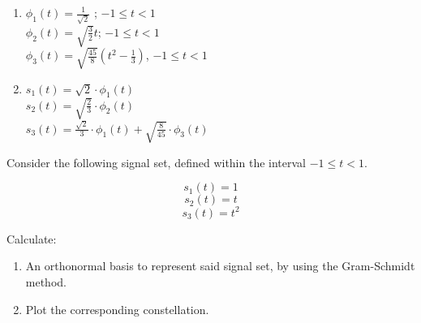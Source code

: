 \documentclass[es,boletin]{uah}
\begin{document}
{
\begin{enumerate}
	\item $\phi_1(t) = \frac{1}{\sqrt{2}}$ ; $-1 \leq t < 1$\\
	 $\phi_2(t) = \sqrt{\frac{3}{2}}t$; $-1 \leq t < 1$\\
	 $\phi_3(t) = \sqrt{\frac{45}{8}}\left ( t^2 - \frac{1}{3}\right )$, $-1 \leq t < 1$
	\item $s_1(t) = \sqrt{2}\cdot \phi_1(t)$\\
		 $s_2(t)=\sqrt{\frac{2}{3}} \cdot \phi_2(t)$\\
		  $s_3(t) = \frac{\sqrt{2}}{3}\cdot \phi_1(t) + \sqrt{\frac{8}{45}} \cdot \phi_3(t)$
\end{enumerate}
}
{

	Consider the following signal set, defined within the interval $-1 \leq t < 1$.

	\begin{displaymath}
		s_1 (t)=1 
	\end{displaymath}
	\begin{displaymath}
		s_2(t) = t
	\end{displaymath}
	\begin{displaymath}
		s_3(t) = t^2
	\end{displaymath}

Calculate:

\begin{enumerate}
	\item An orthonormal basis to represent said signal set, by using the Gram-Schmidt method.
	\item Plot the corresponding constellation.
\end{enumerate}

}
\end{document}
